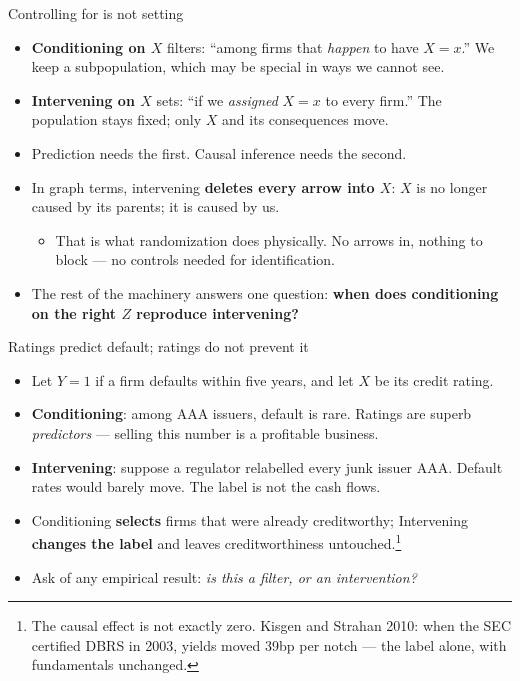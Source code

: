 \documentclass[
  11pt,
  ignorenonframetext,
  aspectratio=169,
]{beamer}
\providecommand{\tightlist}{%
  \setlength{\itemsep}{0pt}\setlength{\parskip}{0pt}}
\begin{document}
\begin{frame}{Controlling for is not setting}
\protect{}\label{controlling-for-is-not-setting}
\begin{itemize}
\tightlist
\item
  \textbf{Conditioning on \(X\)} filters: ``among firms that
  \emph{happen} to have \(X = x\).'' We keep a subpopulation, which may
  be special in ways we cannot see.
\item
  \textbf{Intervening on \(X\)} sets: ``if we \emph{assigned} \(X = x\)
  to every firm.'' The population stays fixed; only \(X\) and its
  consequences move.
\item
  Prediction needs the first. Causal inference needs the second.
\item
  In graph terms, intervening \textbf{deletes every arrow into \(X\)}:
  \(X\) is no longer caused by its parents; it is caused by us.

  \begin{itemize}
  \tightlist
  \item
    That is what randomization does physically. No arrows in, nothing to
    block --- no controls needed for identification.
  \end{itemize}
\item
  The rest of the machinery answers one question: \textbf{when does
  conditioning on the right \(Z\) reproduce intervening?}
\end{itemize}
\end{frame}

\begin{frame}{Ratings predict default; ratings do not prevent it}
\protect{}\label{ratings-predict-default-ratings-do-not-prevent-it}
\begin{itemize}
\tightlist
\item
  Let \(Y = 1\) if a firm defaults within five years, and let \(X\) be
  its credit rating.
\item
  \textbf{Conditioning}: among AAA issuers, default is rare. Ratings are
  superb \emph{predictors} --- selling this number is a profitable
  business.
\item
  \textbf{Intervening}: suppose a regulator relabelled every junk issuer
  AAA. Default rates would barely move. The label is not the cash flows.
\item
  Conditioning \textbf{selects} firms that were already creditworthy;
  Intervening \textbf{changes the label} and leaves creditworthiness
  untouched.\footnote{The causal effect is not exactly zero. Kisgen and Strahan 2010: when the SEC certified DBRS in 2003, yields moved 39bp per notch --- the label alone, with fundamentals unchanged.}
\end{itemize}

\begin{itemize}
\tightlist
\item
  Ask of any empirical result: \emph{is this a filter, or an
  intervention?}
\end{itemize}
\end{frame}
\end{document}
